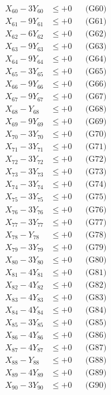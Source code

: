 \documentclass[a4paper,10pt]{article}
\begin{document}
{\begin{align}
X_{60} - 3Y_{60} &\leq +0 && \text{(G60)} \\
X_{61} - 9Y_{61} &\leq +0 && \text{(G61)} \\
X_{62} - 6Y_{62} &\leq +0 && \text{(G62)} \\
X_{63} - 9Y_{63} &\leq +0 && \text{(G63)} \\
X_{64} - 9Y_{64} &\leq +0 && \text{(G64)} \\
X_{65} - 3Y_{65} &\leq +0 && \text{(G65)} \\
X_{66} - 9Y_{66} &\leq +0 && \text{(G66)} \\
X_{67} - 9Y_{67} &\leq +0 && \text{(G67)} \\
X_{68} - Y_{68} &\leq +0 && \text{(G68)} \\
X_{69} - 9Y_{69} &\leq +0 && \text{(G69)} \\
\allowbreak
X_{70} - 3Y_{70} &\leq +0 && \text{(G70)} \\
X_{71} - 3Y_{71} &\leq +0 && \text{(G71)} \\
X_{72} - 3Y_{72} &\leq +0 && \text{(G72)} \\
X_{73} - 3Y_{73} &\leq +0 && \text{(G73)} \\
X_{74} - 3Y_{74} &\leq +0 && \text{(G74)} \\
X_{75} - 3Y_{75} &\leq +0 && \text{(G75)} \\
X_{76} - 3Y_{76} &\leq +0 && \text{(G76)} \\
X_{77} - 3Y_{77} &\leq +0 && \text{(G77)} \\
X_{78} - Y_{78} &\leq +0 && \text{(G78)} \\
X_{79} - 3Y_{79} &\leq +0 && \text{(G79)} \\
\allowbreak
X_{80} - 3Y_{80} &\leq +0 && \text{(G80)} \\
X_{81} - 4Y_{81} &\leq +0 && \text{(G81)} \\
X_{82} - 4Y_{82} &\leq +0 && \text{(G82)} \\
X_{83} - 4Y_{83} &\leq +0 && \text{(G83)} \\
X_{84} - 4Y_{84} &\leq +0 && \text{(G84)} \\
X_{85} - 3Y_{85} &\leq +0 && \text{(G85)} \\
X_{86} - 4Y_{86} &\leq +0 && \text{(G86)} \\
X_{87} - 4Y_{87} &\leq +0 && \text{(G87)} \\
X_{88} - Y_{88} &\leq +0 && \text{(G88)} \\
X_{89} - 4Y_{89} &\leq +0 && \text{(G89)} \\
\allowbreak
X_{90} - 3Y_{90} &\leq +0 && \text{(G90)} \\

\end{align}}
\end{document}
